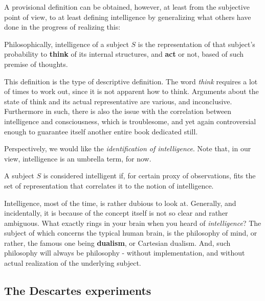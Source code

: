 A provisional definition can be obtained, however, at least from the subjective point of view, to at least defining intelligence by generalizing what others have done in the progress of realizing this:  

\begin{definition}\label{def:intel1}
    Philosophically, intelligence of a subject $S$ is the representation of that subject's probability to \textbf{think} of its internal structures, and \textbf{act} or not, based of such premise of thoughts.
\end{definition}

This definition is the type of descriptive definition. The word \textit{think} requires a lot of times to work out, since it is not apparent how to think. Arguments about the state of think and its actual representative are various, and inconclusive. Furthermore in such, there is also the issue with the correlation between intelligence and consciousness, which is troublesome, and yet again controversial enough to guarantee itself another entire book dedicated still. 

Perspectively, we would like the \textit{identification of intelligence}. Note that, in our view, intelligence is an umbrella term, for now.  

\begin{definition}
    A subject $S$ is considered intelligent if, for certain proxy of observations, fits the set of representation that correlates it to the notion of intelligence. 
\end{definition}

Intelligence, most of the time, is rather dubious to look at. Generally, and incidentally, it is because of the concept itself is not so clear and rather ambiguous. What exactly rings in your brain when you heard of \textit{intelligence}? The subject of which concerns the typical human brain, is the philosophy of mind, or rather, the famous one being \textbf{dualism}, or Cartesian dualism. And, such philosophy will always be philosophy - without implementation, and without actual realization of the underlying subject. 

\subsection{The Descartes experiments}

